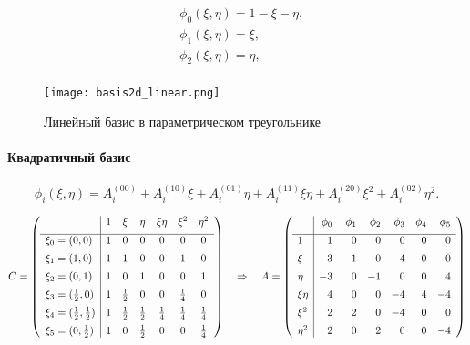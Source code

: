 \begin{equation}
\label{eq:triangle_linear_basis}
\begin{aligned}
&\phi_0(\xi, \eta) = 1 - \xi - \eta, \\
&\phi_1(\xi, \eta) = \xi, \\
&\phi_2(\xi, \eta) = \eta, \\
\end{aligned}
\end{equation}

\begin{figure}[h!]
\centering
\texttt{[image: basis2d\_linear.png]}
\caption{Линейный базис в параметрическом треугольнике}
\label{fig:basis2d_linear}
\end{figure}


\paragraph{Квадратичный базис}
\begin{equation*}
\phi_i(\xi, \eta) = A_i^{(00)} + A_i^{(10)} \xi + A_i^{(01)} \eta + A_i^{(11)} \xi \eta + A_i^{(20)} \xi^2 + A_i^{(02)} \eta^2.
\end{equation*}

\begin{equation*}
C =
\left(
\begin{array}{l|cccccc}
                     & 1 & \xi      & \eta        & \xi\eta  & \xi^2    & \eta^2   \\[5pt]
\hline
\xi_0 = (0, 0)               & 1 &  0       &  0          &   0      &    0     &   0      \\[5pt]
\xi_1 = (1, 0)               & 1 &  1       &  0          &   0      &    1     &   0      \\[5pt]
\xi_2 = (0, 1)               & 1 &  0       &  1          &   0      &    0     &   1      \\[5pt]
\xi_3 = (\tfrac12, 0)        & 1 & \tfrac12 &  0          &   0      & \tfrac14 &   0      \\[5pt]
\xi_4 = (\tfrac12, \tfrac12) & 1 & \tfrac12 &  \tfrac12   & \tfrac14 & \tfrac14 & \tfrac14 \\[5pt]
\xi_5 = (0, \tfrac12)        & 1 &  0       &  \tfrac12   &   0      &    0     & \tfrac14 
\end{array}
\right)
\quad\Rightarrow\quad
A = \left(
\begin{array}{l|rrrrrr}
        & \phi_0 & \phi_1 & \phi_2 & \phi_3 & \phi_4 & \phi_5 \\[5pt]
\hline
1       & 1  &  0 & 0 & 0 & 0 & 0\\[5pt]
\xi     & -3 & -1 & 0 & 4 & 0 & 0\\[5pt]
\eta    & -3 & 0 & -1 & 0 & 0 & 4\\[5pt]
\xi\eta & 4 & 0 & 0 & -4 & 4 & -4\\[5pt]
\xi^2   & 2 & 2 & 0 & -4 & 0 & 0 \\[5pt]
\eta^2  & 2 & 0 & 2 & 0 & 0 & -4
\end{array}
\right)
\end{equation*}

